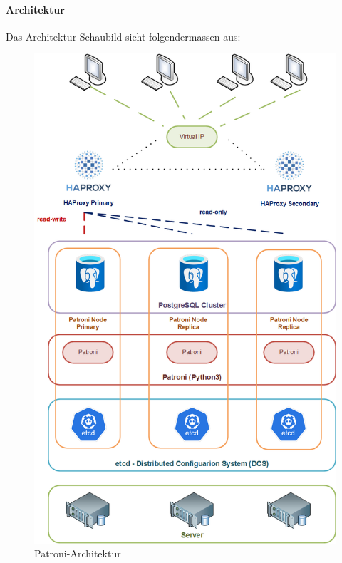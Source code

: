 \begin{flushleft}
    \paragraph{Architektur}
    Das Architektur-Schaubild sieht folgendermassen aus:
    \begin{figure}[H]
        \centering
        \includegraphics[width=0.75\linewidth]{source/implementation/evaluation/postgresql_ha_solutions/patroni_architecture}
        \caption{Patroni-Architektur}
        \label{fig:patroni-architecture}
    \end{figure}
\end{flushleft}
